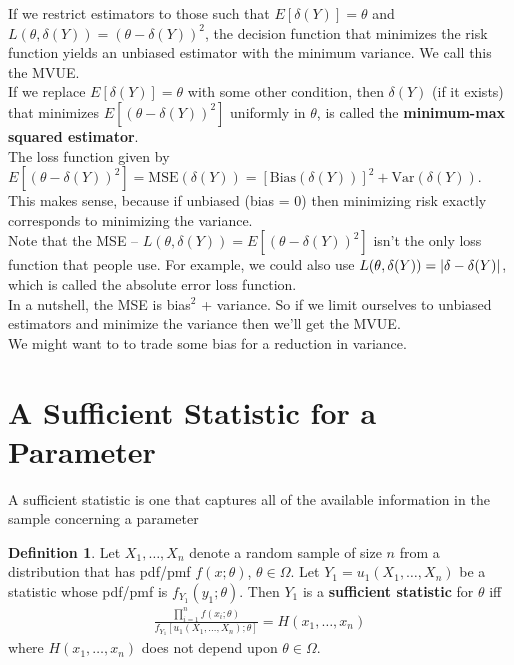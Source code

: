 \documentclass{book}
\theoremstyle{definition}
\newtheorem{defn}{Definition}[section]
\newcommand{\Var}{\text{Var}}
\newcommand{\f}[2]{\frac{#1}{#2}}
\begin{document}
If we restrict estimators to those such that $E[\delta(Y)] = \theta$ and $L(\theta, \delta(Y)) = (\theta - \delta(Y))^2$, the decision function that minimizes the risk function yields an unbiased estimator with the minimum variance. We call this the MVUE. \\

If we replace $E[\delta(Y)] = \theta$ with some other condition, then $\delta(Y)$ (if it exists) that minimizes $E[(\theta - \delta(Y))^2]$ uniformly in $\theta$, is called the \textbf{minimum-max squared estimator}.\\

The loss function given by $E[(\theta - \delta(Y))^2] = \text{MSE}(\delta(Y)) = [\mbox{Bias}(\delta (Y))]^2 + \Var(\delta(Y))$. This makes sense, because if unbiased (bias = 0) then minimizing risk exactly corresponds to minimizing the variance. \\

Note that the MSE -- $L(\theta, \delta(Y)) = E[(\theta - \delta(Y))^2]$ isn't the only loss function that people use. For example, we could also use $L(\theta, \delta(Y)) = \abs{\delta - \delta(Y)}$, which is called the absolute error loss function. \\

In a nutshell, the MSE is bias$^2$ + variance. So if we limit ourselves to unbiased estimators and minimize the variance then we'll get the MVUE. \\

We might want to to trade some bias for a reduction in variance. 






\section{A Sufficient Statistic for a Parameter}

A sufficient statistic is one that captures all of the available information in the sample concerning a parameter 

\begin{defn}
	Let $X_1,\dots,X_n$ denote a random sample of size $n$ from a distribution that has pdf/pmf $f(x;\theta)$, $\theta \in \Omega$. Let $Y_1 = u_1 (X_1,\dots,X_n)$ be a statistic whose pdf/pmf is $f_{Y_1}(y_1;\theta)$. Then $Y_1$ is a \textbf{sufficient statistic} for $\theta$ iff 
	\begin{align}
	\f{\prod^n_{i=1}f(x_i;\theta)}{f_{Y_1}[u_1(X_1,\dots,X_n);\theta]} = H(x_1,\dots,x_n)
	\end{align}
	where $H(x_1,\dots,x_n)$ does not depend upon $\theta \in \Omega$.
\end{defn}
\end{document}
